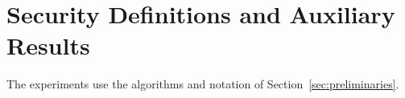 \section{Security Definitions and Auxiliary Results}
\label{app:primitive-security}

The experiments use the algorithms and notation of Section~\ref{sec:preliminaries}.








